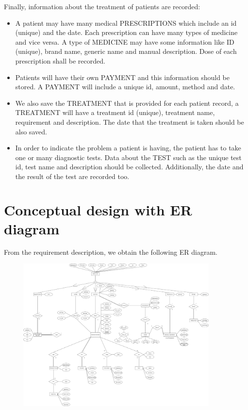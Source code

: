 \documentclass[a4paper]{article}
\numberwithin{equation}{section}
\begin{document}
Finally, information about the treatment of patients are recorded:
\begin{itemize}
  \item A patient may have many medical PRESCRIPTIONS which include an id (unique) and the date.
        Each prescription can have many types of medicine and vice versa.
        A type of MEDICINE may have some information like ID (unique), brand name, generic name and manual description.
        Dose of each prescription shall be recorded.

  \item Patients will have their own PAYMENT and this information should be stored.
        A PAYMENT will include a unique id, amount, method and date.

  \item We also save the TREATMENT that is provided for each patient record, a TREATMENT will have a treatment id (unique), treatment name, requirement and description.
        The date that the treatment is taken should be also saved.

  \item In order to indicate the problem a patient is having, the patient has to take one or many diagnostic tests.
        Data about the TEST such as the unique test id, test name and description should be collected.
        Additionally, the date and the result of the test are recorded too.
\end{itemize}

\newpage

\section{Conceptual design with ER diagram}
From the requirement description, we obtain the following ER diagram.

\begin{figure}[H]
  \centering
  \includegraphics[width=0.9\textwidth]{./assets/erd.png}\label{ER diagram of hospital management system}
\end{figure}
\end{document}
